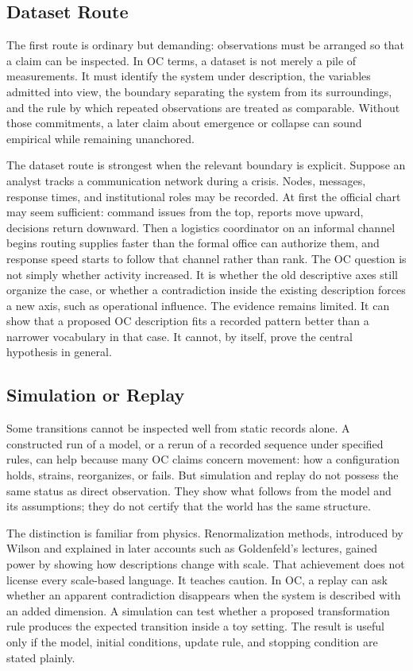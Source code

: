 \documentclass[11pt,a4paper,openany]{book}
\begin{document}
\subsection{Dataset Route}
The first route is ordinary but demanding: observations must be arranged so that a claim can be inspected. In OC terms, a dataset is not merely a pile of measurements. It must identify the system under description, the variables admitted into view, the boundary separating the system from its surroundings, and the rule by which repeated observations are treated as comparable. Without those commitments, a later claim about emergence or collapse can sound empirical while remaining unanchored. \cite{goldenfeld_lectures,kadanoff_scaling}\par
The dataset route is strongest when the relevant boundary is explicit. Suppose an analyst tracks a communication network during a crisis. Nodes, messages, response times, and institutional roles may be recorded. At first the official chart may seem sufficient: command issues from the top, reports move upward, decisions return downward. Then a logistics coordinator on an informal channel begins routing supplies faster than the formal office can authorize them, and response speed starts to follow that channel rather than rank. The OC question is not simply whether activity increased. It is whether the old descriptive axes still organize the case, or whether a contradiction inside the existing description forces a new axis, such as operational influence. The evidence remains limited. It can show that a proposed OC description fits a recorded pattern better than a narrower vocabulary in that case. It cannot, by itself, prove the central hypothesis in general.\par
\subsection{Simulation or Replay}
Some transitions cannot be inspected well from static records alone. A constructed run of a model, or a rerun of a recorded sequence under specified rules, can help because many OC claims concern movement: how a configuration holds, strains, reorganizes, or fails. But simulation and replay do not possess the same status as direct observation. They show what follows from the model and its assumptions; they do not certify that the world has the same structure. \cite{goldenfeld_lectures,kadanoff_scaling}\par
The distinction is familiar from physics. Renormalization methods, introduced by Wilson and explained in later accounts such as Goldenfeld's lectures, gained power by showing how descriptions change with scale. That achievement does not license every scale-based language. It teaches caution. In OC, a replay can ask whether an apparent contradiction disappears when the system is described with an added dimension. A simulation can test whether a proposed transformation rule produces the expected transition inside a toy setting. The result is useful only if the model, initial conditions, update rule, and stopping condition are stated plainly.\par
\end{document}
